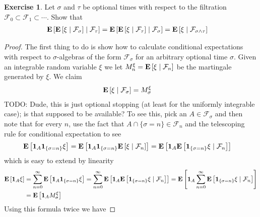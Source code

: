 \documentclass{amsart}
\theoremstyle{remark}
\theoremstyle{definition}
\newtheorem{ex}[thm]{Exercise}
\begin{document}
\begin{ex}Let $\sigma$ and $\tau$ be optional times with respect to
  the filtration $\mathcal{F}_0 \subset \mathcal{F}_1 \subset
  \cdots$.  Show that 
\begin{align*}
\cexpectationlong
{\mathcal{F}_\tau}{\cexpectationlong{\mathcal{F}_\sigma}{\xi}} &=
\cexpectationlong
{\mathcal{F}_\sigma}{\cexpectationlong{\mathcal{F}_\tau}{\xi}} = \cexpectationlong
{\mathcal{F}_{\sigma \wedge \tau}}{\xi}
\end{align*}
\end{ex}
\begin{proof}
The first thing to do is show how to calculate conditional
expectations with respect to $\sigma$-algebras of the form
$\mathcal{F}_\sigma$ for an arbitrary optional time $\sigma$.  Given
an integrable random variable $\xi$ we let $M^\xi_n =
\cexpectationlong{\mathcal{F}_n}{\xi}$ be the martingale generated by
$\xi$.  We claim
\begin{align*}
\cexpectationlong{\mathcal{F}_\sigma}{\xi} &= M^\xi_\sigma
\end{align*}
TODO:  Dude, this is just optional stopping (at least for the
uniformly integrable case); is that supposed to be available?
To see this, pick an $A \in \mathcal{F}_\sigma$ and then note that for
every $n$, use the fact that $A \cap \lbrace \sigma = n \rbrace \in
\mathcal{F}_n$ and the telescoping rule for conditional expectation to see
\begin{align*}
\expectation{\characteristic{A} \characteristic{\lbrace \sigma = n
    \rbrace } \xi} &= 
\expectation{\characteristic{A} \characteristic{\lbrace \sigma = n
    \rbrace } \cexpectationlong{\mathcal{F}_n}{\xi} } = 
\expectation{\characteristic{A} \cexpectationlong{\mathcal{F}_n}{\characteristic{\lbrace \sigma = n
    \rbrace } \xi} } 
\end{align*}
which is easy to extend by linearity 
\begin{align*}
\expectation{\characteristic{A} \xi} &= \sum_{n=0}^\infty \expectation{\characteristic{A} \characteristic{\lbrace \sigma = n
    \rbrace } \xi} = \sum_{n=0}^\infty \expectation{\characteristic{A} \cexpectationlong{\mathcal{F}_n}{\characteristic{\lbrace \sigma = n
    \rbrace } \xi}} = \expectation{\characteristic{A}
  \sum_{n=0}^\infty \cexpectationlong{\mathcal{F}_n}{\characteristic{\lbrace \sigma = n
    \rbrace } \xi}} \\
&= \expectation{\characteristic{A} M^\xi_\sigma}
\end{align*}
Using this formula twice we have

\end{proof}
\end{document}
